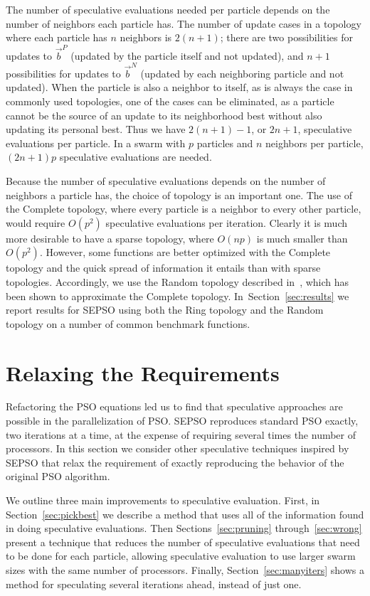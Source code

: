 \documentclass[ms,electronic,twosidetoc,letterpaper,chaptercenter,parttop,equalmargins]{byumsphd}
\renewcommand{\sec}[1]{Section~\ref{sec:#1}}
\providecommand{\pers}{\ensuremath{P}}
\providecommand{\neigh}{\ensuremath{N}}
\providecommand{\nbest}{\ensuremath{\Vec{b}^\neigh}}
\providecommand{\pbest}{\ensuremath{\Vec{b}^\pers}}
\begin{document}
The number of speculative evaluations needed per particle depends on the number
of neighbors each particle has.  The number of update cases in a topology where
each particle has $n$ neighbors is $2(n+1)$; there are two possibilities for
updates to $\pbest$ (updated by the particle itself and not updated), and $n+1$
possibilities for updates to $\nbest$ (updated by each neighboring particle and
not updated).  When the particle is also a neighbor to itself, as is always the
case in commonly used topologies, one of the cases can be eliminated, as a
particle cannot be the source of an update to its neighborhood best without
also updating its personal best.  Thus we have $2(n+1)-1$, or $2n+1$,
speculative evaluations per particle.  In a swarm with $p$ particles and $n$
neighbors per particle, $(2n+1)p$ speculative evaluations are needed.

Because the number of speculative evaluations depends on the number of
neighbors a particle has, the choice of topology is an important one.  The use
of the Complete topology, where every particle is a neighbor to every other
particle, would require $O(p^2)$ speculative evaluations per iteration.
Clearly it is much more desirable to have a sparse topology, where $O(np)$ is
much smaller than $O(p^2)$.  However, some functions are better optimized with
the Complete topology and the quick spread of information it entails than with
sparse topologies.  Accordingly, we use the Random topology described
in~\citep{mcnabb-2009-large-particle-swarms}, which has been shown to
approximate the Complete topology.  In~\sec{results} we report results for
SEPSO using both the Ring topology and the Random topology on a number of
common benchmark functions.

\chapter{Relaxing the Requirements}
\label{sec:relax}

Refactoring the PSO equations led us to find that speculative approaches are
possible in the parallelization of PSO.  SEPSO reproduces standard PSO exactly,
two iterations at a time, at the expense of requiring several times the number
of processors.  In this section we consider other speculative techniques
inspired by SEPSO that relax the requirement of exactly reproducing the
behavior of the original PSO algorithm.

We outline three main improvements to speculative evaluation.  First, in
\sec{pickbest} we describe a method that uses all of the information found in
doing speculative evaluations.  Then Sections~\ref{sec:pruning}
through~\ref{sec:wrong} present a technique that reduces the number of
speculative evaluations that need to be done for each particle, allowing
speculative evaluation to use larger swarm sizes with the same number of
processors.  Finally, \sec{manyiters} shows a method for speculating several
iterations ahead, instead of just one.
\end{document}
